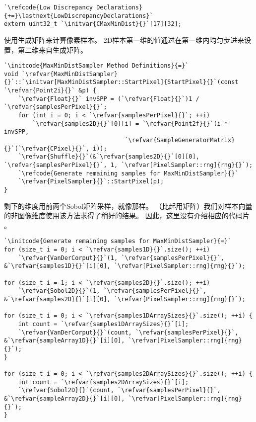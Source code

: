 \begin{lstlisting}
`\refcode{Low Discrepancy Declarations}{+=}\lastnext{LowDiscrepancyDeclarations}`
extern uint32_t `\initvar{CMaxMinDist}{}`[17][32];
\end{lstlisting}

使用生成矩阵来计算像素样本。
2D样本第一维的值通过在第一维内均匀步进来设置，第二维来自生成矩阵。
\begin{lstlisting}
`\initcode{MaxMinDistSampler Method Definitions}{=}`
void `\refvar{MaxMinDistSampler}{}`::`\initvar[MaxMinDistSampler::StartPixel]{StartPixel}{}`(const `\refvar{Point2i}{}` &p) {
    `\refvar{Float}{}` invSPP = (`\refvar{Float}{}`)1 / `\refvar{samplesPerPixel}{}`;
    for (int i = 0; i < `\refvar{samplesPerPixel}{}`; ++i)
        `\refvar{samples2D}{}`[0][i] = `\refvar{Point2f}{}`(i * invSPP, 
                                  `\refvar{SampleGeneratorMatrix}{}`(`\refvar{CPixel}{}`, i));
    `\refvar{Shuffle}{}`(&`\refvar{samples2D}{}`[0][0], `\refvar{samplesPerPixel}{}`, 1, `\refvar[PixelSampler::rng]{rng}{}`);
    `\refcode{Generate remaining samples for MaxMinDistSampler}{}`
    `\refvar{PixelSampler}{}`::StartPixel(p);
}
\end{lstlisting}

剩下的维度用前两个Sobol矩阵采样，就像那样。
（比起用矩阵）我们对样本向量的非图像维度使用该方法求得了稍好的结果。
因此，这里没有介绍相应的代码片{}
。
\begin{lstlisting}
`\initcode{Generate remaining samples for MaxMinDistSampler}{=}`
for (size_t i = 0; i < `\refvar{samples1D}{}`.size(); ++i)
    `\refvar{VanDerCorput}{}`(1, `\refvar{samplesPerPixel}{}`, &`\refvar{samples1D}{}`[i][0], `\refvar[PixelSampler::rng]{rng}{}`);

for (size_t i = 1; i < `\refvar{samples2D}{}`.size(); ++i)
    `\refvar{Sobol2D}{}`(1, `\refvar{samplesPerPixel}{}`, &`\refvar{samples2D}{}`[i][0], `\refvar[PixelSampler::rng]{rng}{}`);

for (size_t i = 0; i < `\refvar{samples1DArraySizes}{}`.size(); ++i) {
    int count = `\refvar{samples1DArraySizes}{}`[i];
    `\refvar{VanDerCorput}{}`(count, `\refvar{samplesPerPixel}{}`, &`\refvar{sampleArray1D}{}`[i][0], `\refvar[PixelSampler::rng]{rng}{}`);
}

for (size_t i = 0; i < `\refvar{samples2DArraySizes}{}`.size(); ++i) {
    int count = `\refvar{samples2DArraySizes}{}`[i];
    `\refvar{Sobol2D}{}`(count, `\refvar{samplesPerPixel}{}`, &`\refvar{sampleArray2D}{}`[i][0], `\refvar[PixelSampler::rng]{rng}{}`);
}
\end{lstlisting}